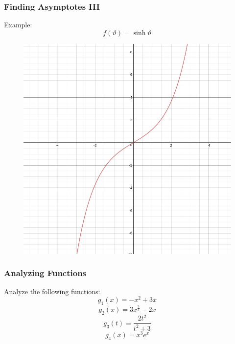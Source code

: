 \documentclass[xcolor=dvipsnames]{beamer}
\begin{document}
\begin{frame}
  \frametitle{Finding Asymptotes III}
Example:
\begin{equation}
  \label{eq:waduoqui}
  f(\vartheta)=\sinh\vartheta
\end{equation}
\begin{figure}[h]
\includegraphics[scale=.25]{./diagrams/asymp6.png}
\end{figure}
\end{frame}

\begin{frame}
  \frametitle{Analyzing Functions}
Analyze the following functions:
\begin{equation}
  \label{eq:ohkaedoy}
g_{1}(x)=-x^{2}+3x
\end{equation}
\begin{equation}
  \label{eq:teecakie}
g_{2}(x)=3x^{\frac{2}{3}}-2x
\end{equation}
\begin{equation}
  \label{eq:saepaego}
g_{3}(t)=\frac{2t^{2}}{t^{2}+3}
\end{equation}
\begin{equation}
  \label{eq:xohsaemu}
g_{4}(x)=x^{3}e^{x}
\end{equation}
\end{frame}
\end{document}
